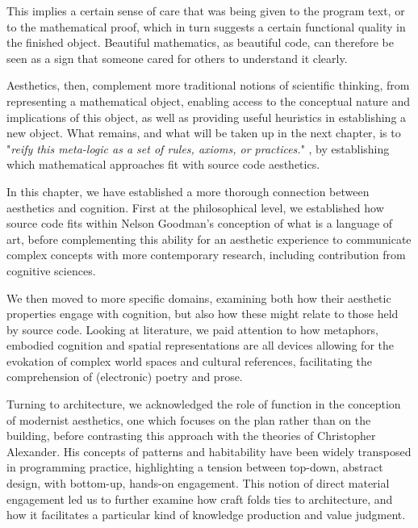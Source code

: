 \spacersmall

This implies a certain sense of care that was being given to the program text, or to the mathematical proof, which in turn suggests a certain functional quality in the finished object. Beautiful mathematics, as beautiful code, can therefore be seen as a sign that someone cared for others to understand it clearly.

Aesthetics, then, complement more traditional notions of scientific thinking, from representing a mathematical object, enabling access to the conceptual nature and implications of this object, as well as providing useful heuristics in establishing a new object. What remains, and what will be taken up in the next chapter, is to "\emph{reify this meta-logic as a set of rules, axioms, or practices.}" \citep{root-bernstein_aesthetic_2002}, by establishing which mathematical approaches fit with source code aesthetics.

\spacer

In this chapter, we have established a more thorough connection between aesthetics and cognition. First at the philosophical level, we established how source code fits within Nelson Goodman's conception of what is a language of art, before complementing this ability for an aesthetic experience to communicate complex concepts with more contemporary research, including contribution from cognitive sciences.

We then moved to more specific domains, examining both how their aesthetic properties engage with cognition, but also how these might relate to those held by source code. Looking at literature, we paid attention to how metaphors, embodied cognition and spatial representations are all devices allowing for the evokation of complex world spaces and cultural references, facilitating the comprehension of (electronic) poetry and prose.

Turning to architecture, we acknowledged the role of function in the conception of modernist aesthetics, one which focuses on the plan rather than on the building, before contrasting this approach with the theories of Christopher Alexander. His concepts of patterns and habitability have been widely transposed in programming practice, highlighting a tension between top-down, abstract design, with bottom-up, hands-on engagement. This notion of direct material engagement led us to further examine how craft folds ties to architecture, and how it facilitates a particular kind of knowledge production and value judgment.


